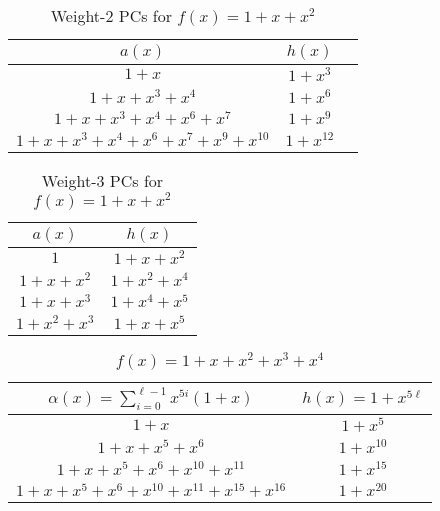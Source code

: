 \begin{table}[htbp]
 \caption{Weight-2 PCs for $f(x)=1+x+x^2$}
\centering
 \begin{tabular}{c c c} 
 \toprule
 $a(x)$ & $h(x)$ \\ [0.5ex] 
 \midrule
$1+x$
 & $1+x^{3}$ \\
\hline
$1+x+x^3+x^4$
 & $1+x^{6}$ 
 \\
\hline
$1+x+x^3+x^4+x^6+x^{7}$ 
&  $1+x^{9}$ 
\\
\hline
$1+x+x^3+x^4+x^6+x^{7}+x^9+x^{10}$
 &  $1+x^{12}$ \\
 \bottomrule
 \end{tabular}
 \label{novelTab2}
\end{table}

\begin{table}[htbp]
 \caption{Weight-3 PCs for $f(x)=1+x+x^2$}
\centering
 \begin{tabular}{c c} 
 \toprule
 $a(x)$ & $h(x)$\\ [0.5ex] 
 \midrule
$1$ & $1+x+x^2$\\ 
\hline
$1+x+x^2$ &  $1+x^2+x^4$\\
\hline
$1+x+x^3$ & $1+x^4+x^5$\\
\hline
$1+x^2+x^3$ & $1+x+x^5$ \\
\bottomrule
 \end{tabular}
 \label{novelTab8}
\end{table}

\begin{table}[htbp]
\caption{$f(x)=1+x+x^2+x^3+x^4$}
\centering
\begin{tabular}{c c} 
 \toprule
 $\alpha(x)=\sum_{i=0}^{\ell-1} x^{5i}(1+x)$ & $h(x)=1+x^{5\ell}$  \\ [0.5ex] 
 \midrule
$1+x$ &$1+x^5$\\ 
\hline
$1+x+x^5+x^6$ &$1+x^{10}$  \\
\hline
$1+x+x^5+x^6+x^{10}+x^{11}$ & $1+x^{15}$ \\
\hline
$1+x+x^5+x^6+x^{10}+x^{11}+x^{15}+x^{16}$ &$1+x^{20}$  \\
\bottomrule
 \end{tabular}
 \label{novelTab3}
\end{table}

